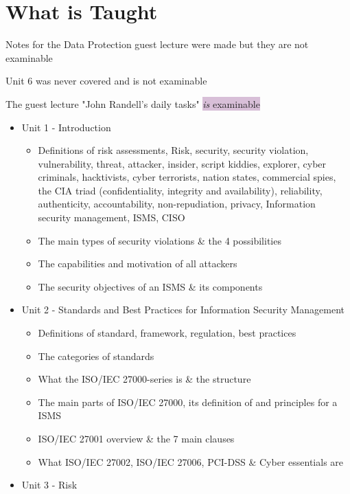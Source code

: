 \documentclass[tikz,border=10pt]{project_plan}
\begin{document}
\chapter*{What is Taught}

Notes for the Data Protection guest lecture were made but they are not examinable

Unit 6 was never covered and is not examinable

The guest lecture "John Randell's daily tasks" \colorbox{Thistle}{\textit{is} examinable}

\begin{itemize}
  \item Unit 1 - Introduction
        \begin{itemize}
          \item Definitions of risk assessments, Risk, security, security violation,
                vulnerability, threat, attacker, insider, script kiddies, explorer,
                cyber criminals, hacktivists, cyber terrorists, nation states, commercial
                spies, the CIA triad (confidentiality, integrity and availability),
                reliability, authenticity, accountability, non-repudiation, privacy,
                Information security management, ISMS, CISO
          \item The main types of security violations \& the 4 possibilities
          \item The capabilities and motivation of all attackers
          \item The security objectives of an ISMS \& its components
        \end{itemize}
  \item Unit 2 - Standards and Best Practices for Information Security Management
        \begin{itemize}
          \item Definitions of standard, framework, regulation, best practices
          \item The categories of standards
          \item What the ISO/IEC 27000-series is \& the structure
          \item The main parts of ISO/IEC 27000, its definition of and principles for a ISMS
          \item ISO/IEC 27001 overview \& the 7 main clauses
          \item What ISO/IEC 27002, ISO/IEC 27006, PCI-DSS \& Cyber essentials are
        \end{itemize}
  \item Unit 3 - Risk

\end{itemize}
\end{document}
